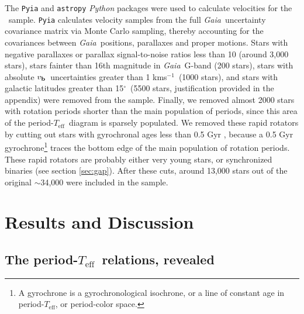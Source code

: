 \documentclass{aastex63}
\newcommand{\gaia}{{\it Gaia}}
\newcommand{\teff}{$T_{\mathrm{eff}}$}
\newcommand{\degrees}{$^\circ$}
\newcommand{\vb}{$v_{\bf b}$}
\newcommand{\kms}{kms$^{-1}$}
\newcommand{\mct}{\citet{mcquillan2014}}
\newcommand{\racomment}[1]{{\color{blue}#1}}
\begin{document}
The {\tt Pyia} \citep{price-whelan_2018} and {\tt astropy} \citep{astropy2013,
astropy2018} {\it Python} packages were used to calculate velocities for the
\mct\ sample.
{\tt Pyia} calculates velocity samples from the full \gaia\ uncertainty
covariance matrix via Monte Carlo sampling, thereby accounting for the
covariances between \gaia\ positions, parallaxes and proper motions.
Stars with negative parallaxes or parallax signal-to-noise ratios less than 10
(around 3,000 stars), stars fainter than 16th magnitude \racomment{in \gaia\
G-band} (200 stars), stars with absolute \vb\ uncertainties greater than 1
\kms\ (1000 stars), and stars with galactic latitudes greater than 15\degrees\
(5500 stars, justification provided in the appendix) were removed from the
sample.
Finally, we removed almost 2000 stars with rotation periods shorter than the
main population of periods, since this area of the period-\teff\ diagram is
sparsely populated.
We removed these rapid rotators by cutting out stars with gyrochronal ages
less than 0.5 Gyr \citep[based on the][gyro-model]{angus2019}, because a 0.5
Gyr gyrochrone\footnote{A gyrochrone is a gyrochronological isochrone, or a
line of constant age in period-\teff, or period-color space.} traces the
bottom edge of the main population of rotation periods.
\racomment{These rapid rotators are probably either very young stars, or
synchronized binaries (see section \ref{sec:gap}).} After these cuts, around
13,000 stars out of the original $\sim$34,000 were included in the sample.

\section{Results and Discussion}
\label{sec:results}

\subsection{The period-\teff\ relations, revealed}
\label{sec:the_reveal}
\end{document}
